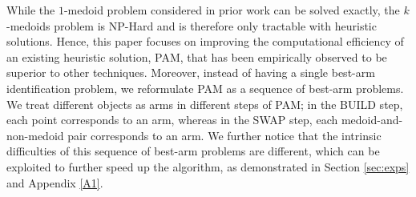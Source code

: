 While the $1$-medoid problem considered in prior work can be solved exactly, the $k$-medoids problem is NP-Hard and is therefore only tractable with heuristic solutions. Hence, this paper focuses on improving the computational efficiency of an existing heuristic solution, PAM, that has been empirically observed to be superior to other techniques.
Moreover, instead of having a single best-arm identification problem, we reformulate PAM as a sequence of best-arm problems. We treat different objects as arms in different steps of PAM; in the BUILD step, each point corresponds to an arm, whereas in the SWAP step, each medoid-and-non-medoid pair corresponds to an arm.
We further notice that the intrinsic difficulties of this sequence of best-arm problems are different, which can be exploited to further speed up the algorithm, as demonstrated in Section \ref{sec:exps} and Appendix \ref{A1}.

